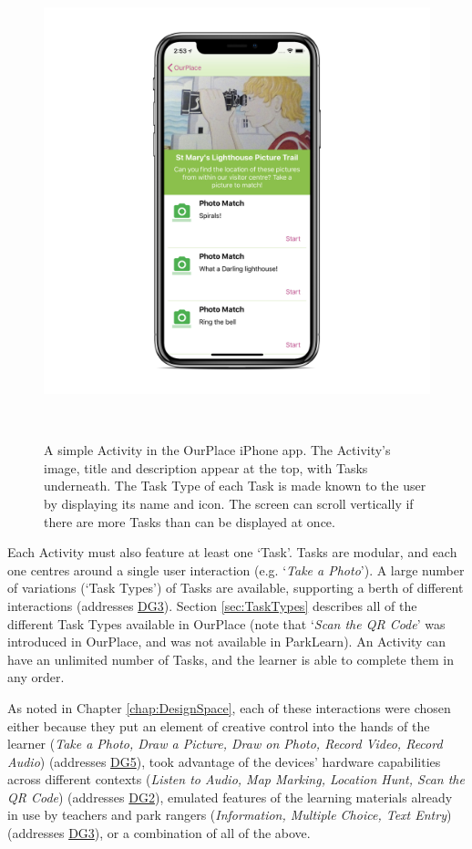 \begin{figure}
  \centering
  \includegraphics[width=0.85\columnwidth]{images/chapter05/activity.png}
  \caption{ A simple Activity in the OurPlace iPhone app. The Activity's image, title and description appear at the top, with Tasks underneath. The Task Type of each Task is made known to the user by displaying its name and icon. The screen can scroll vertically if there are more Tasks than can be displayed at once. }~\label{fig:ActivityExample}
\end{figure}

Each Activity must also feature at least one `Task'. Tasks are modular, and each one centres around a single user interaction (e.g. `\textit{Take a Photo}'). A large number of variations (`Task Types') of Tasks are available, supporting a berth of different interactions (addresses \hyperref[DG3]{DG3}). Section \ref{sec:TaskTypes} describes all of the different Task Types available in OurPlace (note that `\textit{Scan the QR Code}' was introduced in OurPlace, and was not available in ParkLearn). An Activity can have an unlimited number of Tasks, and the learner is able to complete them in any order.

As noted in Chapter \ref{chap:DesignSpace}, each of these interactions were chosen either because they put an element of creative control into the hands of the learner (\textit{Take a Photo, Draw a Picture, Draw on Photo, Record Video, Record Audio}) (addresses \hyperref[DG5]{DG5}), took advantage of the devices’ hardware capabilities across different contexts (\textit{Listen to Audio, Map Marking, Location Hunt, Scan the QR Code}) (addresses \hyperref[DG2]{DG2}), emulated features of the learning materials already in use by teachers and park rangers (\textit{Information, Multiple Choice, Text Entry}) (addresses \hyperref[DG3]{DG3}), or a combination of all of the above.

